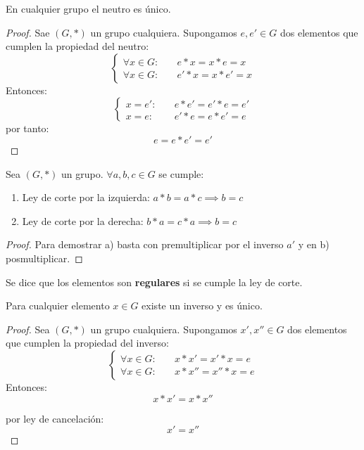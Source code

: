 \begin{proposition}
	En cualquier grupo el neutro es único. 
\end{proposition}
\begin{proof}
	Sae $(G, *)$ un grupo cualquiera. Supongamos $e, e' \in G$ dos elementos que cumplen la propiedad del neutro:
	\[ \begin{cases}
		\forall x \in G:& \quad e*x = x*e = x\\
		\forall x \in G:& \quad e'*x = x*e' = x
	\end{cases} \]
	Entonces:
	\[ \begin{cases}
		x = e':& \quad e*e' = e'*e = e'\\
		x = e:& \quad e'*e = e*e' = e
	\end{cases} \]
	por tanto:
	\[ e = e*e' = e' \]
\end{proof}


\begin{fmd-proposition}  
	Sea $(G, *)$ un grupo. $\forall a, b, c \in G$ se cumple:
	
	\begin{enumerate}[label=\alph*)]
		\item Ley de corte por la izquierda: $a * b = a * c \implies b = c$
		\item Ley de corte por la derecha: $b*a = c*a \implies b = c$
	\end{enumerate}
	\begin{proof}
		Para demostrar a) basta con premultiplicar por el inverso $a'$ y en b) posmultiplicar.
	\end{proof}
\end{fmd-proposition}

Se dice que los elementos son \textbf{regulares} si se cumple la ley de corte.

\begin{proposition} 
	Para cualquier elemento $x \in G$ existe un inverso y es único.
	
	\begin{proof}
		Sea $(G, *)$ un grupo cualquiera. Supongamos $x', x'' \in G$ dos elementos que cumplen la propiedad del inverso:
		\[ \begin{cases}
			\forall x \in G:& \quad x*x' = x'*x = e\\
			\forall x \in G:& \quad x*x'' = x''*x = e
		\end{cases} \]
		Entonces:
		\[ x * x' = x * x'' \]
		
		por ley de cancelación: \[ x' = x'' \]
	\end{proof}
\end{proposition}

